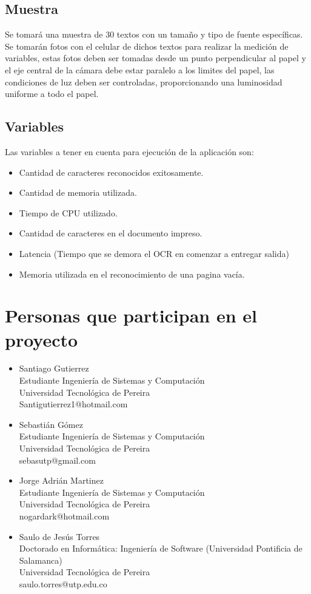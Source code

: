 \documentclass[a4paper, 11pt, oneside]{article}
\begin{document}
	\subsection{Muestra}
	Se tomará una muestra de 30 textos con un tamaño y tipo de fuente específicas. Se tomarán
	fotos con el celular de dichos textos para realizar la medición de variables, estas fotos deben ser
	tomadas desde un punto perpendicular al papel y el eje central de la cámara debe estar paralelo a 
	los limites del papel, las condiciones de luz deben ser controladas, proporcionando una luminosidad
	uniforme a todo el papel.
	
	\subsection{Variables}
	Las variables a tener en cuenta para ejecución de la aplicación son:
	\begin{itemize}
	\item Cantidad de caracteres reconocidos exitosamente.
	\item Cantidad de memoria utilizada.
	\item Tiempo de CPU utilizado.
	\item Cantidad de caracteres en el documento impreso.
	\item Latencia (Tiempo que se demora el OCR en comenzar a entregar salida)
	\item Memoria utilizada en el reconocimiento de una pagina vacía.
	\end{itemize}
	\clearpage
	
	\section{Personas que participan en el proyecto}
	\begin{itemize}
   \item Santiago Gutierrez\\
Estudiante Ingeniería de Sistemas y Computación\\
Universidad Tecnológica de Pereira\\
Santigutierrez1@hotmail.com
   \item Sebastián Gómez\\
Estudiante Ingeniería de Sistemas y Computación\\
Universidad Tecnológica de Pereira\\
sebasutp@gmail.com
   \item Jorge Adrián Martinez\\
Estudiante Ingeniería de Sistemas y Computación\\
Universidad Tecnológica de Pereira\\
nogardark@hotmail.com
   \item Saulo de Jesús Torres\\
Doctorado en Informática: Ingeniería de Software (Universidad Pontificia de Salamanca)\\
Universidad Tecnológica de Pereira\\
saulo.torres@utp.edu.co
	\end{itemize}
	\clearpage
	
\end{document}
